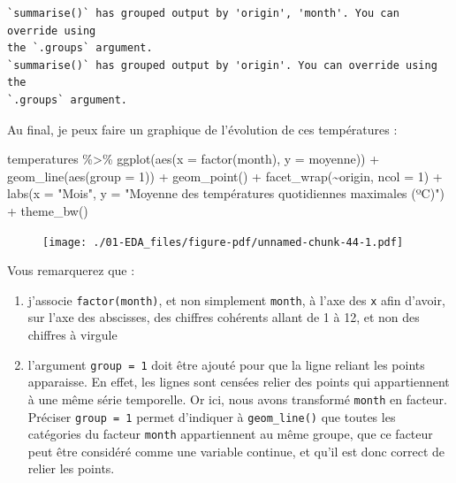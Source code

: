 \documentclass[
  a4paper,
  DIV=11,
  numbers=noendperiod,
  oneside]{scrreprt}
\newenvironment{Shaded}{}{}
\newcommand{\AttributeTok}[1]{\textcolor[rgb]{0.84,0.23,0.29}{#1}}
\newcommand{\DecValTok}[1]{\textcolor[rgb]{0.00,0.36,0.77}{#1}}
\newcommand{\FunctionTok}[1]{\textcolor[rgb]{0.44,0.26,0.76}{#1}}
\newcommand{\NormalTok}[1]{\textcolor[rgb]{0.14,0.16,0.18}{#1}}
\newcommand{\SpecialCharTok}[1]{\textcolor[rgb]{0.00,0.36,0.77}{#1}}
\newcommand{\StringTok}[1]{\textcolor[rgb]{0.01,0.18,0.38}{#1}}
\providecommand{\tightlist}{%
  \setlength{\itemsep}{0pt}\setlength{\parskip}{0pt}}\usepackage{longtable,booktabs,array}
\begin{document}
\begin{verbatim}
`summarise()` has grouped output by 'origin', 'month'. You can override using
the `.groups` argument.
`summarise()` has grouped output by 'origin'. You can override using the
`.groups` argument.
\end{verbatim}

Au final, je peux faire un graphique de l'évolution de ces températures
:

\begin{Shaded}
\begin{Highlighting}[]
\NormalTok{temperatures }\SpecialCharTok{\%\textgreater{}\%} 
  \FunctionTok{ggplot}\NormalTok{(}\FunctionTok{aes}\NormalTok{(}\AttributeTok{x =} \FunctionTok{factor}\NormalTok{(month), }\AttributeTok{y =}\NormalTok{ moyenne)) }\SpecialCharTok{+}
  \FunctionTok{geom\_line}\NormalTok{(}\FunctionTok{aes}\NormalTok{(}\AttributeTok{group =} \DecValTok{1}\NormalTok{)) }\SpecialCharTok{+}
  \FunctionTok{geom\_point}\NormalTok{() }\SpecialCharTok{+}
  \FunctionTok{facet\_wrap}\NormalTok{(}\SpecialCharTok{\textasciitilde{}}\NormalTok{origin, }\AttributeTok{ncol =} \DecValTok{1}\NormalTok{) }\SpecialCharTok{+}
  \FunctionTok{labs}\NormalTok{(}\AttributeTok{x =} \StringTok{"Mois"}\NormalTok{, }
       \AttributeTok{y =} \StringTok{"Moyenne des températures quotidiennes maximales (ºC)"}\NormalTok{) }\SpecialCharTok{+}
  \FunctionTok{theme\_bw}\NormalTok{()}
\end{Highlighting}
\end{Shaded}

\begin{figure}[H]

{\centering \texttt{[image: ./01-EDA\_files/figure-pdf/unnamed-chunk-44-1.pdf]}

}

\end{figure}

Vous remarquerez que :

\begin{enumerate}
\def\labelenumi{\arabic{enumi}.}
\tightlist
\item
  j'associe \texttt{factor(month)}, et non simplement \texttt{month}, à
  l'axe des \texttt{x} afin d'avoir, sur l'axe des abscisses, des
  chiffres cohérents allant de 1 à 12, et non des chiffres à virgule
\item
  l'argument \texttt{group\ =\ 1} doit être ajouté pour que la ligne
  reliant les points apparaisse. En effet, les lignes sont censées
  relier des points qui appartiennent à une même série temporelle. Or
  ici, nous avons transformé \texttt{month} en facteur. Préciser
  \texttt{group\ =\ 1} permet d'indiquer à \texttt{geom\_line()} que
  toutes les catégories du facteur \texttt{month} appartiennent au même
  groupe, que ce facteur peut être considéré comme une variable
  continue, et qu'il est donc correct de relier les points.
\end{enumerate}
\end{document}

